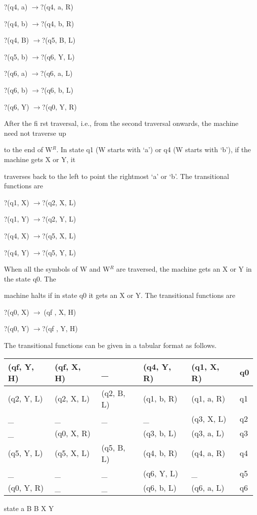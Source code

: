 \noindent ?(q4, a) $\to $?(q4, a, R)

\noindent ?(q4, b) $\to $?(q4, b, R)

\noindent ?(q4, B) $\to $?(q5, B, L)

\noindent ?(q5, b) $\to $?(q6, Y, L)

\noindent ?(q6, a) $\to $?(q6, a, L)

\noindent ?(q6, b) $\to $?(q6, b, L)

\noindent ?(q6, Y) $\to $?(q0, Y, R)

\noindent After the fi rst traversal, i.e., from the second traversal onwards, the machine need not traverse up

\noindent to the end of W${}^{R}$. In state q1 (W starts with `a') or q4 (W starts with `b'), if the machine gets X or Y, it

\noindent traverses back to the left to point the rightmost `a' or `b'. The transitional functions are

\noindent ?(q1, X) $\to $?(q2, X, L)

\noindent ?(q1, Y) $\to $?(q2, Y, L)

\noindent ?(q4, X) $\to $?(q5, X, L)

\noindent ?(q4, Y) $\to $?(q5, Y, L)

\noindent When all the symbols of W and W${}^{R}$ are traversed, the machine gets an X or Y in the state q0. The

\noindent machine halts if in state q0 it gets an X or Y. The transitional functions are

\noindent ?(q0, X) $\to \ $(qf , X, H)

\noindent ?(q0, Y) $\to $?(qf , Y, H)

\noindent The transitional functions can be given in a tabular format as follows.

\noindent 

\begin{tabular}{|p{0.7in}|p{0.7in}|p{0.7in}|p{0.7in}|p{0.7in}|p{0.7in}|} \hline 
(qf, Y, H) & (qf, X, H) & \_ & (q4, Y, R) & (q1, X, R) & q0 \\ \hline 
(q2, Y, L) & (q2, X, L) & (q2, B, L) & (q1, b, R) & (q1, a, R) & q1 \\ \hline 
\_ & \_ & \_ & \_ & (q3, X, L) & q2 \\ \hline 
\_ & (q0, X, R) &  & (q3, b, L) & (q3, a, L) & q3 \\ \hline 
(q5, Y, L) & (q5, X, L) & (q5, B, L) & (q4, b, R) & (q4, a, R) & q4 \\ \hline 
\_ & \_ & \_ & (q6, Y, L) & \_ & q5 \\ \hline 
(q0, Y, R) & \_ & \_ & (q6, b, L) & (q6, a, L) & q6 \\ \hline 
\end{tabular}

             state                       a                           B                             B                            X                           Y

\noindent    

\noindent 

\noindent 

\noindent 

\noindent 

